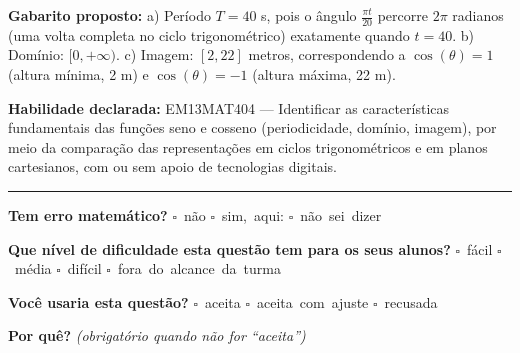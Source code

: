 \documentclass[11pt,a4paper]{article}
\begin{document}
\begin{samepage}
\textbf{Gabarito proposto:} a) Período $T = 40$ s, pois o ângulo $\frac{\pi t}{20}$ percorre $2\pi$ radianos (uma volta completa no ciclo trigonométrico) exatamente quando $t=40$. b) Domínio: $[0,+\infty)$. c) Imagem: $[2,22]$ metros, correspondendo a $\cos(\theta)=1$ (altura mínima, 2 m) e $\cos(\theta)=-1$ (altura máxima, 22 m).

\textbf{Habilidade declarada:} EM13MAT404 --- Identificar as características fundamentais das funções seno e cosseno (periodicidade, domínio, imagem), por meio da comparação das representações em ciclos trigonométricos e em planos cartesianos, com ou sem apoio de tecnologias digitais.
\end{samepage}

\noindent\rule{\linewidth}{0.4pt}
\textbf{Tem erro matemático?}\quad
\mbox{$\square$~não} \quad \mbox{$\square$~sim, aqui:} \underline{\hspace{5cm}}
\quad \mbox{$\square$~não sei dizer}

\textbf{Que nível de dificuldade esta questão tem para os seus alunos?}\quad
\mbox{$\square$~fácil} \quad \mbox{$\square$~média} \quad
\mbox{$\square$~difícil} \quad \mbox{$\square$~fora do alcance da turma}

\textbf{Você usaria esta questão?}\quad
\mbox{$\square$~aceita} \quad \mbox{$\square$~aceita com ajuste} \quad
\mbox{$\square$~recusada}

\textbf{Por quê?} \emph{(obrigatório quando não for ``aceita'')}

\underline{\hspace{\linewidth}}

\underline{\hspace{\linewidth}}
\vspace{0.6em}
\end{document}
